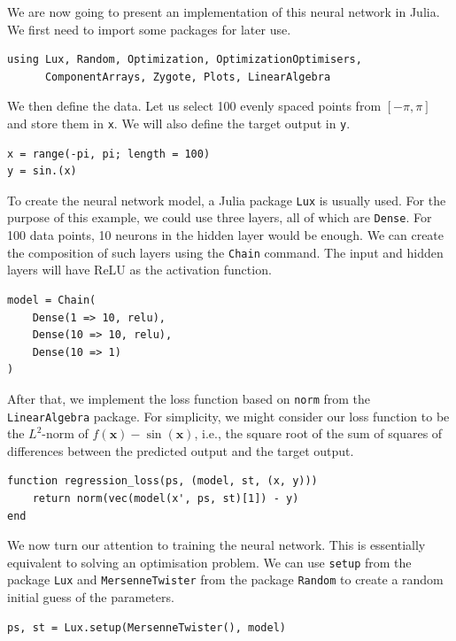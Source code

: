 \documentclass[a4paper,11pt,titlepage]{article}
\theoremstyle{definition}
\theoremstyle{plain}
\theoremstyle{remark}
\begin{document}
We are now going to present an implementation of this neural network in Julia. We first need to import some packages for later use. 

\begin{verbatim}
using Lux, Random, Optimization, OptimizationOptimisers,
      ComponentArrays, Zygote, Plots, LinearAlgebra
\end{verbatim}

We then define the data. Let us select 100 evenly spaced points from $[-\pi, \pi]$ and store them in \verb|x|. We will also define the target output in \verb|y|.

\begin{verbatim}
x = range(-pi, pi; length = 100)
y = sin.(x)
\end{verbatim}

To create the neural network model, a Julia package \verb|Lux| is usually used. For the purpose of this example, we could use three layers, all of which are \verb|Dense|. For 100 data points, 10 neurons in the hidden layer would be enough. We can create the composition of such layers using the \verb|Chain| command. The input and hidden layers will have ReLU as the activation function.

\begin{verbatim}
model = Chain(
    Dense(1 => 10, relu),
    Dense(10 => 10, relu),
    Dense(10 => 1)
)
\end{verbatim}

After that, we implement the loss function based on \verb|norm| from the \verb|LinearAlgebra| package. For simplicity, we might consider our loss function to be the $L^2$-norm of $f(\mathbf{x}) - \sin (\mathbf{x})$, i.e., the square root of the sum of squares of differences between the predicted output and the target output.

\begin{verbatim}
function regression_loss(ps, (model, st, (x, y)))
    return norm(vec(model(x', ps, st)[1]) - y)
end
\end{verbatim}

We now turn our attention to training the neural network. This is essentially equivalent to solving an optimisation problem. We can use \verb|setup| from the package \verb|Lux| and \verb|MersenneTwister| from the package \verb|Random| to create a random initial guess of the parameters.

\begin{verbatim}
ps, st = Lux.setup(MersenneTwister(), model)
\end{verbatim}
\end{document}
